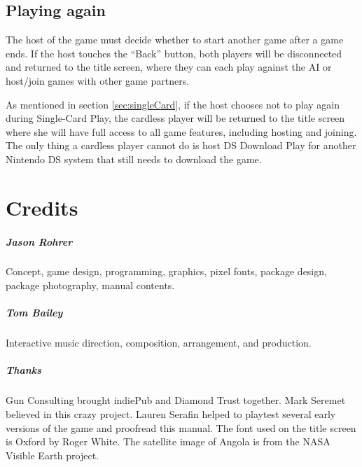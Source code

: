 \documentclass[8pt]{extbook}
\makeatletter
\newcommand{\startopenany}{\@openrightfalse}
\newcommand{\stopopenany}{\@openrighttrue}
\makeatother
\begin{document}
\section{Playing again}
The host of the game must decide whether to start another game after a game ends.  If the host touches the ``Back'' button, both players will be disconnected and returned to the title screen, where they can each play against the AI or host/join games with other game partners.

As mentioned in section \ref{sec:singleCard}, if the host chooses not to play again during Single-Card Play, the cardless player will be returned to the title screen where she will have full access to all game features, including hosting and joining.  The only thing a cardless player cannot do is host DS Download Play for another Nintendo DS system that still needs to download the game.



\startopenany
\chapter*{Credits}

\paragraph{Jason Rohrer}
Concept, game design, programming, graphics, pixel fonts, package design, package photography, manual contents.

\paragraph{Tom Bailey}
Interactive music direction, composition, arrangement, and production.

\paragraph{Thanks}
Gun Consulting brought indiePub and Diamond Trust together.  Mark Seremet believed in this crazy project.  Lauren Serafin helped to playtest several early versions of the game and proofread this manual.  The font used on the title screen is Oxford by Roger White.  The satellite image of Angola is from the NASA Visible Earth project.

\stopopenany





\end{document}
